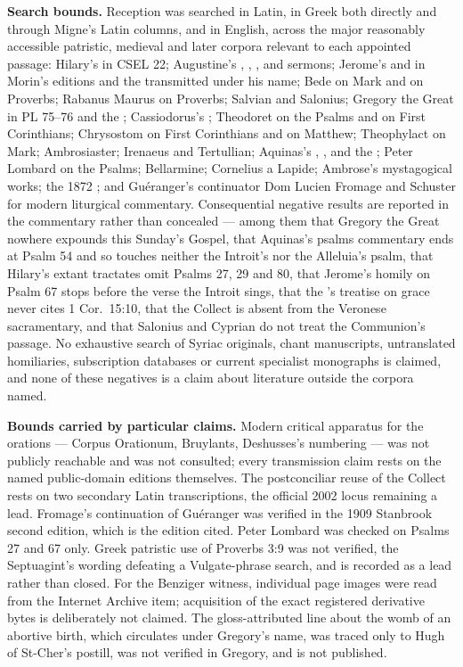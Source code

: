 \textbf{Search bounds.} Reception was searched in Latin, in Greek both directly
and through Migne's Latin columns, and in English, across the major reasonably
accessible patristic, medieval and later corpora relevant to each appointed
passage: Hilary's  in CSEL 22; Augustine's
, , , and sermons; Jerome's  and
 in Morin's editions and the 
transmitted under his name; Bede on Mark and on Proverbs; Rabanus Maurus on
Proverbs; Salvian and Salonius; Gregory the Great in PL 75--76 and the
; Cassiodorus's ; Theodoret on the
Psalms and on First Corinthians; Chrysostom on First Corinthians and on
Matthew; Theophylact on Mark; Ambrosiaster; Irenaeus and Tertullian; Aquinas's
, ,  and the ; Peter Lombard on the Psalms;
Bellarmine; Cornelius a Lapide; Ambrose's mystagogical works; the 1872
; and Guéranger's continuator Dom Lucien Fromage and Schuster for
modern liturgical commentary. Consequential negative results are reported in the commentary
rather than concealed --- among them that Gregory the Great nowhere expounds
this Sunday's Gospel, that Aquinas's psalms commentary ends at Psalm 54 and so
touches neither the Introit's nor the Alleluia's psalm, that Hilary's extant
tractates omit Psalms 27, 29 and 80, that Jerome's homily on Psalm 67 stops
before the verse the Introit sings, that the 's treatise on grace
never cites 1 Cor.~15:10, that the Collect is absent from the Veronese
sacramentary, and that Salonius and Cyprian do not treat the Communion's
passage. No exhaustive search of Syriac originals, chant manuscripts,
untranslated homiliaries, subscription databases or current specialist
monographs is claimed, and none of these negatives is a claim about literature
outside the corpora named.

\textbf{Bounds carried by particular claims.} Modern critical apparatus for the
orations --- Corpus Orationum, Bruylants, Deshusses's numbering --- was not
publicly reachable and was not consulted; every transmission claim rests on the
named public-domain editions themselves. The postconciliar reuse of the Collect
rests on two secondary Latin transcriptions, the official 2002 locus remaining
a lead. Fromage's continuation of Guéranger was verified in the 1909 Stanbrook
second edition, which is the edition cited. Peter Lombard was checked on Psalms 27 and 67
only. Greek patristic use of Proverbs 3:9 was not verified, the Septuagint's
wording defeating a Vulgate-phrase search, and is recorded as a lead rather
than closed. For the Benziger witness, individual page images were read from the
Internet Archive item; acquisition of the exact registered derivative bytes is
deliberately not claimed. The gloss-attributed line about the womb of an
abortive birth, which circulates under Gregory's name, was traced only to Hugh
of St-Cher's postill, was not verified in Gregory, and is not published.

